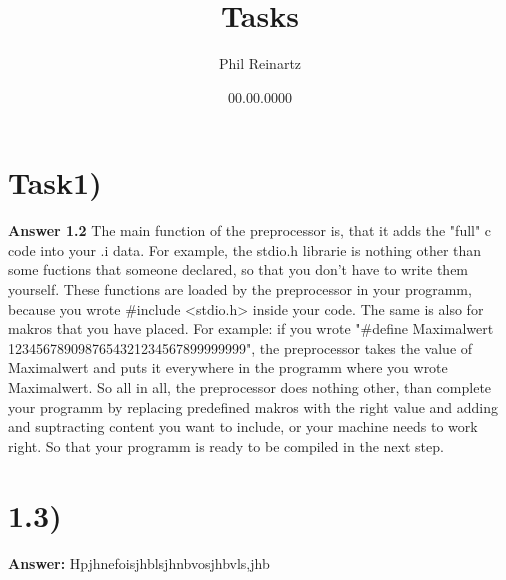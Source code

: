 \documentclass{article}
\title{Tasks}
\author{Phil Reinartz}
\date{00.00.0000}
\begin{document}
\maketitle

\section{Task1)}

\textbf{Answer 1.2} The main function of the preprocessor is, that it adds the "full" c code into your .i data. For example, the stdio.h librarie is nothing other than some fuctions that someone declared, so that you don't have to write them yourself. These functions are loaded by the preprocessor in your programm, because you wrote \#include <stdio.h> inside your code. The same is also for makros that you have placed. For example: if you wrote "\#define Maximalwert 1234567890987654321234567899999999", the preprocessor takes the value of Maximalwert and puts it everywhere in the programm where you wrote Maximalwert. So all in all, the preprocessor does nothing other, than complete your programm by replacing predefined makros with the right value and adding and suptracting content you want to include, or your machine needs to work right.
So that your programm is ready to be compiled in the next step.




\section{1.3)}

\textbf{Answer:} Hpjhnefoisjhblsjhnbvosjhbvls,jhb
\end{document}
